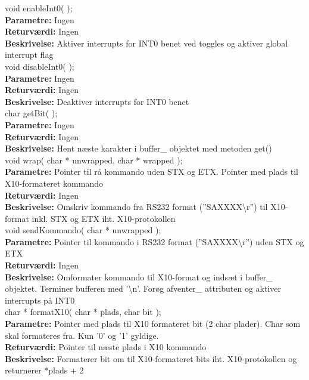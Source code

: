 void enableInt0( ); \\
\textbf{Parametre:} Ingen \\
\textbf{Returværdi:} Ingen \\
\textbf{Beskrivelse:} Aktiver interrupts for INT0 benet ved toggles og aktiver global interrupt flag \\

void disableInt0( ); \\
\textbf{Parametre:} Ingen \\
\textbf{Returværdi:} Ingen \\
\textbf{Beskrivelse:} Deaktiver interrupts for INT0 benet \\

char getBit( ); \\
\textbf{Parametre:} Ingen \\
\textbf{Returværdi:} Ingen \\
\textbf{Beskrivelse:} Hent næste karakter i buffer\_ objektet med metoden get() \\

void wrap( char * unwrapped, char * wrapped ); \\
\textbf{Parametre:} Pointer til rå kommando uden STX og ETX. Pointer med plads til X10-formateret kommando \\
\textbf{Returværdi:} Ingen \\
\textbf{Beskrivelse:} Omskriv kommando fra RS232 format (''SAXXXX\textbackslash r'') til X10-format inkl. STX og ETX iht. X10-protokollen \\

void sendKommando( char * unwrapped ); \\
\textbf{Parametre:} Pointer til kommando i RS232 format (''SAXXXX\textbackslash r'') uden STX og ETX \\
\textbf{Returværdi:} Ingen \\
\textbf{Beskrivelse:} Omformater kommando til X10-format og indsæt i buffer\_ objektet. Terminer bufferen med '\textbackslash n'. Forøg afventer\_ attributen og aktiver interrupts på INT0 \\

char * formatX10( char * plads, char bit ); \\
\textbf{Parametre:} Pointer med plads til X10 formateret bit (2 char plader). Char som skal formateres fra. Kun '0' og '1' gyldige. \\
\textbf{Returværdi:} Pointer til næste plads i X10 kommando \\
\textbf{Beskrivelse:} Formaterer bit om til X10-formateret bits iht. X10-protokollen og returnerer *plads + 2 \\

